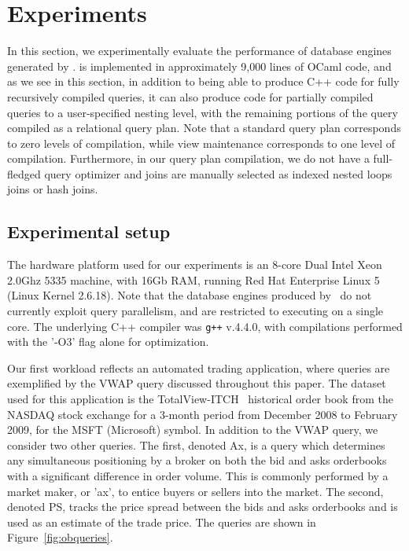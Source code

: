 \section{Experiments}

In this section, we experimentally evaluate the performance of database engines
generated by \compiler. \compiler is implemented in approximately 9,000 lines of
OCaml code, and as we see in this section, in addition to being able to produce
C++ code for fully recursively compiled queries, it can also produce code for
partially compiled queries to a user-specified nesting level, with the remaining
portions of the query compiled as a relational query plan. Note that a standard
query plan corresponds to zero levels of compilation, while view maintenance
corresponds to one level of compilation. Furthermore, in our query plan
compilation, we do not have a full-fledged query optimizer and joins are
manually selected as indexed nested loops joins or hash joins.

\subsection{Experimental setup}
The hardware platform used for our experiments is an 8-core Dual Intel Xeon
2.0Ghz 5335 machine, with 16Gb RAM, running Red Hat Enterprise Linux 5 (Linux
Kernel 2.6.18). Note that the database engines produced by \compiler\ do not
currently exploit query parallelism, and are restricted to executing on a single
core. The underlying C++ compiler was \texttt{g++} v.4.4.0, with compilations
performed with the '-O3' flag alone for optimization.

Our first workload reflects an automated trading application, where queries are
exemplified by the VWAP query discussed throughout this paper.  The dataset used
for this application is the TotalView-ITCH~\cite{totalview-url} historical order
book from the NASDAQ stock exchange for a 3-month period from December 2008 to
February 2009, for the MSFT (Microsoft) symbol. In addition to the VWAP query,
we consider two other queries. The first, denoted Ax, is a query which
determines any simultaneous positioning by a broker on both the bid and asks
orderbooks with a significant difference in order volume. This is commonly
performed by a market maker, or 'ax', to entice buyers or sellers into the
market. The second, denoted PS, tracks the price spread between the bids and
asks orderbooks and is used as an estimate of the trade price. The queries are
shown in Figure~\ref{fig:obqueries}.

